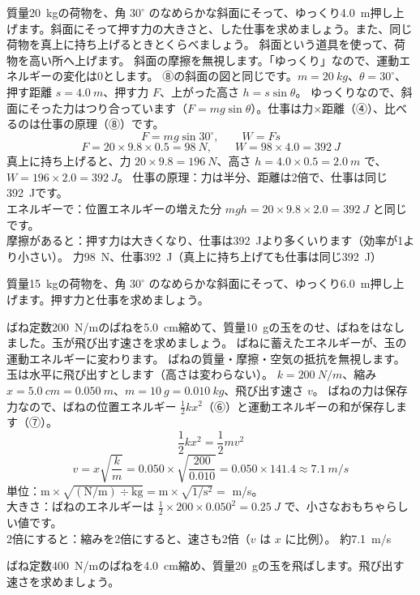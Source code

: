 \label{ph:力-4:ex3}
\begin{phreidai}[荷物を斜面で押し上げる]
質量\qty{20}{kg}の荷物を、角 $30^\circ$ のなめらかな斜面にそって、ゆっくり\qty{4.0}{m}押し上げます。斜面にそって押す力の大きさと、した仕事を求めましょう。また、同じ荷物を真上に持ち上げるときとくらべましょう。
\phbamen
斜面という道具を使って、荷物を高い所へ上げます。
\phmushi
斜面の摩擦を無視します。「ゆっくり」なので、運動エネルギーの変化は0とします。
\phzu
⑧の斜面の図と同じです。$m=\qty{20}{kg}$、$\theta=30^\circ$、押す距離 $s=\qty{4.0}{m}$、押す力 $F$、上がった高さ $h=s\sin\theta$。
\phriyu
ゆっくりなので、斜面にそった力はつり合っています（$F=mg\sin\theta$）。仕事は力×距離（④）、比べるのは仕事の原理（⑧）です。
\phtateru
\[F=mg\sin30^\circ,\qquad W=Fs\]
\phtoku
\[F=20\times9.8\times0.5=\qty{98}{N},\qquad W=98\times4.0=\qty{392}{J}\]
真上に持ち上げると、力 $20\times9.8=\qty{196}{N}$、高さ $h=4.0\times0.5=\qty{2.0}{m}$ で、$W=196\times2.0=\qty{392}{J}$。
\phtashikame
仕事の原理：力は半分、距離は2倍で、仕事は同じ\qty{392}{J}です。\\
エネルギーで：位置エネルギーの増えた分 $mgh=20\times9.8\times2.0=\qty{392}{J}$ と同じです。\\
摩擦があると：押す力は大きくなり、仕事は\qty{392}{J}より多くいります（効率が1より小さい）。
\kotae 力\qty{98}{N}、仕事\qty{392}{J}（真上に持ち上げても仕事は同じ\qty{392}{J}）
\end{phreidai}
\begin{jibun}
質量\qty{15}{kg}の荷物を、角 $30^\circ$ のなめらかな斜面にそって、ゆっくり\qty{6.0}{m}押し上げます。押す力と仕事を求めましょう。
\end{jibun}

\label{ph:力-4:ex4}
\begin{phreidai}[おもちゃの鉄砲]
ばね定数\qty{200}{N/m}のばねを\qty{5.0}{cm}縮めて、質量\qty{10}{g}の玉をのせ、ばねをはなしました。玉が飛び出す速さを求めましょう。
\phbamen
ばねに蓄えたエネルギーが、玉の運動エネルギーに変わります。
\phmushi
ばねの質量・摩擦・空気の抵抗を無視します。玉は水平に飛び出すとします（高さは変わらない）。
\phzu
$k=\qty{200}{N/m}$、縮み $x=\qty{5.0}{cm}=\qty{0.050}{m}$、$m=\qty{10}{g}=\qty{0.010}{kg}$、飛び出す速さ $v$。
\phriyu
ばねの力は保存力なので、ばねの位置エネルギー $\tfrac{1}{2}kx^2$（⑥）と運動エネルギーの和が保存します（⑦）。
\phtateru
\[\frac{1}{2}kx^2=\frac{1}{2}mv^2\]
\phtoku
\[v=x\sqrt{\frac{k}{m}}=0.050\times\sqrt{\frac{200}{0.010}}=0.050\times141.4\approx\qty{7.1}{m/s}\]
\phtashikame
単位：$\text{m}\times\sqrt{(\text{N/m})\div\text{kg}}=\text{m}\times\sqrt{1/\text{s}^2}=$ m/s。\\
大きさ：ばねのエネルギーは $\tfrac{1}{2}\times200\times0.050^2=\qty{0.25}{J}$ で、小さなおもちゃらしい値です。\\
2倍にすると：縮みを2倍にすると、速さも2倍（$v$ は $x$ に比例）。
\kotae 約\qty{7.1}{m/s}
\end{phreidai}
\begin{jibun}
ばね定数\qty{400}{N/m}のばねを\qty{4.0}{cm}縮め、質量\qty{20}{g}の玉を飛ばします。飛び出す速さを求めましょう。
\end{jibun}

